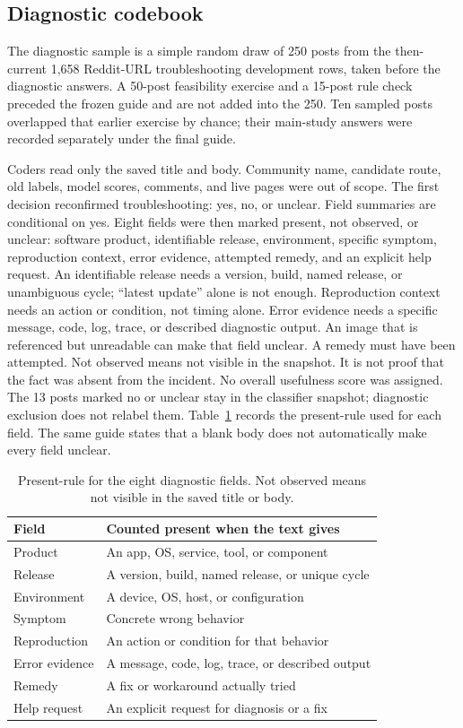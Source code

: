\documentclass[conference,letterpaper]{IEEEtran}
\begin{document}
\subsection{Diagnostic codebook}
The diagnostic sample is a simple random draw of 250 posts from the then-current 1,658 Reddit-URL troubleshooting development rows, taken before the diagnostic answers. A 50-post feasibility exercise and a 15-post rule check preceded the frozen guide and are not added into the 250. Ten sampled posts overlapped that earlier exercise by chance; their main-study answers were recorded separately under the final guide.

Coders read only the saved title and body. Community name, candidate route, old labels, model scores, comments, and live pages were out of scope. The first decision reconfirmed troubleshooting: yes, no, or unclear. Field summaries are conditional on yes. Eight fields were then marked present, not observed, or unclear: software product, identifiable release, environment, specific symptom, reproduction context, error evidence, attempted remedy, and an explicit help request. An identifiable release needs a version, build, named release, or unambiguous cycle; ``latest update'' alone is not enough. Reproduction context needs an action or condition, not timing alone. Error evidence needs a specific message, code, log, trace, or described diagnostic output. An image that is referenced but unreadable can make that field unclear. A remedy must have been attempted. Not observed means not visible in the snapshot. It is not proof that the fact was absent from the incident. No overall usefulness score was assigned. The 13 posts marked no or unclear stay in the classifier snapshot; diagnostic exclusion does not relabel them. Table~\ref{tab:code} records the present-rule used for each field. The same guide states that a blank body does not automatically make every field unclear.

\begin{table}[t]
\caption{Present-rule for the eight diagnostic fields. Not observed means not visible in the saved title or body.}
\label{tab:code}
\centering
\footnotesize
\setlength{\tabcolsep}{3pt}
\begin{tabular}{lp{4.6cm}}
\toprule
Field & Counted present when the text gives \\
\midrule
Product & An app, OS, service, tool, or component \\
Release & A version, build, named release, or unique cycle \\
Environment & A device, OS, host, or configuration \\
Symptom & Concrete wrong behavior \\
Reproduction & An action or condition for that behavior \\
Error evidence & A message, code, log, trace, or described output \\
Remedy & A fix or workaround actually tried \\
Help request & An explicit request for diagnosis or a fix \\
\bottomrule
\end{tabular}
\end{table}
\end{document}
